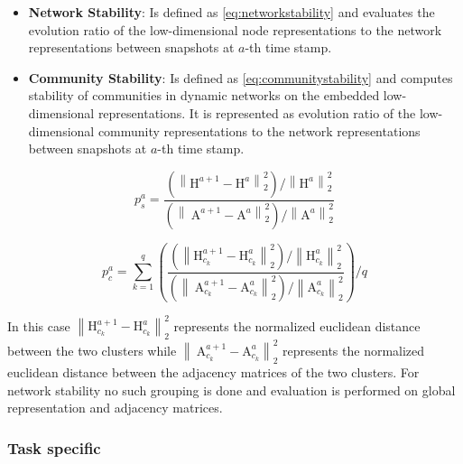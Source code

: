\documentclass[
acmsmall,
nonacm,
screen,
acmthm]{../../scripts/pandoc/templates/acmart}
\providecommand{\tightlist}{%
\setlength{\itemsep}{0pt}\setlength{\parskip}{0pt}}
\begin{document}
\begin{itemize}
\tightlist
\item
  \textbf{Network Stability}: Is defined as \cref{eq:networkstability}
  and evaluates the evolution ratio of the low-dimensional node
  representations to the network representations between snapshots at
  \(a\)-th time stamp.
\item
  \textbf{Community Stability}: Is defined as
  \cref{eq:communitystability} and computes stability of communities in
  dynamic networks on the embedded low-dimensional representations. It
  is represented as evolution ratio of the low-dimensional community
  representations to the network representations between snapshots at
  \(a\)-th time stamp.
\end{itemize}

\begin{equation}
p_{s}^{a}=\frac{\left(\left\|\mathrm{H}^{a+1}-\mathrm{H}^{a}\right\|_{2}^{2}\right) /\left\|\mathrm{H}^{a}\right\|_{2}^{2}}{\left(\left\|\mathrm{~A}^{a+1}-\mathrm{A}^{a}\right\|_{2}^{2}\right) /\left\|\mathrm{A}^{a}\right\|_{2}^{2}}
\label{eq:networkstability}\end{equation}

\begin{equation}
p_{c}^{a}=\sum_{k=1}^{q}\left(\frac{\left(\left\|\mathrm{H}_{c_{k}}^{a+1}-\mathrm{H}_{c_{k}}^{a}\right\|_{2}^{2}\right) /\left\|\mathrm{H}_{c_{k}}^{a}\right\|_{2}^{2}}{\left(\left\|\mathrm{~A}_{c_{k}}^{a+1}-\mathrm{A}_{c_{k}}^{a}\right\|_{2}^{2}\right) /\left\|\mathrm{A}_{c_{k}}^{a}\right\|_{2}^{2}}\right) / q
\label{eq:communitystability}\end{equation}

In this case
\(\left\|\mathrm{H}_{c_{k}}^{a+1}-\mathrm{H}_{c_{k}}^{a}\right\|_{2}^{2}\)
represents the normalized euclidean distance between the two clusters
while
\(\left\|\mathrm{~A}_{c_{k}}^{a+1}-\mathrm{A}_{c_{k}}^{a}\right\|_{2}^{2}\)
represents the normalized euclidean distance between the adjacency
matrices of the two clusters. For network stability no such grouping is
done and evaluation is performed on global representation and adjacency
matrices.

\hypertarget{task-specific}{%
\subsubsection{Task specific}\label{task-specific}}
\end{document}
